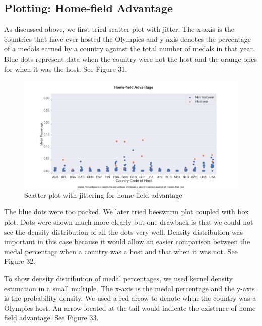 \documentclass[12pt]{article}
\begin{document}
\subsection{Plotting: Home-field Advantage}
As discussed above, we first tried scatter plot with jitter. The x-axis is the countries that have ever hosted the Olympics and y-axis denotes the percentage of a medals earned by a country against the total number of medals in that year. Blue dots represent data when the country were not the host and the orange ones for when it was the host. See Figure 31.

\begin{figure}[!b]
    \centering
    \includegraphics[scale=0.38]{pics/g-2-7.png}
    \caption{Scatter plot with jittering for home-field advantage}
    \label{fig:my_label}
\end{figure}

The blue dots were too packed. We later tried beeswarm plot coupled with box plot. Dots were shown much more clearly but one drawback is that we could not see the density distribution of all the dots very well. Density distribution was important in this case because it would allow an easier comparison between the medal percentage when a country was a host and that when it was not. See Figure 32. 

To show density distribution of medal percentages, we used kernel density estimation in a small multiple. The x-axis is the medal percentage and the y-axis is the probability density. We used a red arrow to denote when the country was a Olympics host. An arrow located at the tail would indicate the existence of home-field advantage. See Figure 33.
\end{document}

